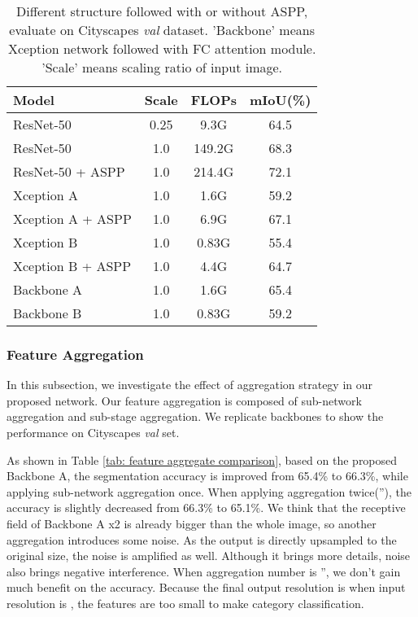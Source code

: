 \documentclass[10pt,twocolumn,letterpaper]{article}
\begin{document}
\begin{table}
\begin{center}
\begin{tabular}{l|c|c|c}
\hline
Model & Scale & FLOPs & mIoU(\%) \\
\hline\hline
ResNet-50 & 0.25 & 9.3G              & 64.5 \\
ResNet-50 & 1.0 &  149.2G             & 68.3 \\
\hline
ResNet-50 + ASPP & 1.0 & 214.4G      & 72.1 \\
\hline\hline

\hline
Xception A          & 1.0    & 1.6G         &  59.2 \\
Xception A + ASPP   & 1.0    & 6.9G         &  67.1 \\
Xception B          & 1.0    & 0.83G        &  55.4 \\
Xception B + ASPP   & 1.0    & 4.4G         &  64.7 \\ 
\hline\hline
Backbone A  & 1.0 & 1.6G    &   65.4  \\
Backbone B  & 1.0 & 0.83G   &   59.2  \\ 
\hline
\end{tabular}
\end{center}
\caption{Different structure followed with or without ASPP, evaluate on Cityscapes \textit{val} dataset. 
'Backbone' means Xception network followed with FC attention module. 'Scale' means scaling ratio of input image.}
\label{tab: backbone comparison}
\end{table}


\subsubsection{Feature Aggregation}
In this subsection, we investigate the effect of aggregation strategy in our proposed network. Our feature aggregation is composed of sub-network aggregation and sub-stage aggregation. We replicate backbones to show the performance on Cityscapes \textit{val} set.

As shown in Table \ref{tab: feature aggregate comparison}, based on the proposed Backbone A, the segmentation accuracy is improved from 65.4\% to 66.3\%, while applying sub-network aggregation once. When applying aggregation twice(''), the accuracy is slightly decreased from 66.3\% to 65.1\%. We think that the receptive field of Backbone A x2 is already bigger than the whole image, so another aggregation introduces some noise. As the output is directly upsampled to the original size, the noise is amplified as well. Although it brings more details, noise also brings negative interference. When aggregation number is '', we don't gain much benefit on the accuracy. Because the final output resolution is  when input resolution is , the features are too small to make category classification. 
\end{document}
